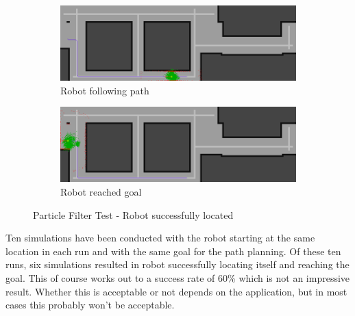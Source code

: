\begin{figure}[H]
\centering

\begin{subfigure}{0.87\textwidth}
\includegraphics[width=\linewidth]{images/pf_test_following_path}
\caption{Robot following path}
\label{fig:pf_test_success_a}
\end{subfigure}

\hspace{\fill}

\begin{subfigure}{0.87\textwidth}
\includegraphics[width=\linewidth]{images/pf_test_reached_goal}
\caption{Robot reached goal}
\label{fig:pf_test_success_b}
\end{subfigure}

\caption{Particle Filter Test - Robot successfully located}
\label{fig:pf_test_success}
\end{figure}

Ten simulations have been conducted with the robot starting at the same location in each run and with the same goal for the path planning. Of these ten runs, six simulations resulted in robot successfully locating itself and reaching the goal. This of course works out to a success rate of 60\% which is not an impressive result. Whether this is acceptable or not depends on the application, but in most cases this probably won't be acceptable.

